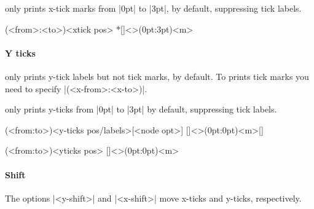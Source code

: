 \icmd{\tzticksx*} only prints x-tick marks from |0pt| to |3pt|, by default, suppressing tick labels.

\begin{tzdef}{}
(<from>:<to>){<xtick pos>}
 *[]<>(0pt:3pt){<m>}
\end{tzdef}


\paragraph{Y ticks}

\icmd{\tzticksy} only prints y-tick labels but not tick marks, by default.
To prints tick marks you need to specify |(<x-from>:<x-to>)|.

\icmd{\tzticksy*} only prints y-ticks from |0pt| to |3pt| by default, suppressing tick labels.

\begin{tzdef}{}
(<from:to>){<y-ticks pos/labels>}[<node opt>]
  []<>(0pt:0pt){<m>}[]
\end{tzdef}

\begin{tzdef}{}
(<from:to>){<yticks pos>}
  []<>(0pt:0pt){<m>}
\end{tzdef}


\begin{tzcode}{.3}
\end{tzcode}

\paragraph{Shift}
The options |<y-shift>| and |<x-shift>| move x-ticks and y-ticks, respectively.

\begin{tzcode}{.3}
\end{tzcode}





